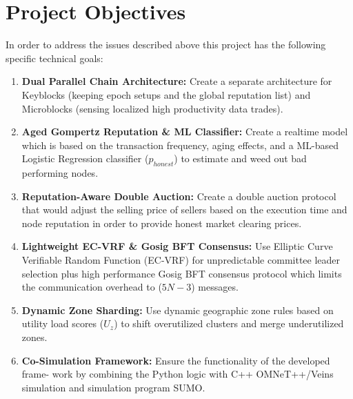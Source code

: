 \section{Project Objectives}\label{sec:intro_objectives}
\noindent In order to address the issues described above this project has the following specific technical goals:
\begin{enumerate}
    \item \textbf{Dual Parallel Chain Architecture:} Create a separate architecture for Keyblocks (keeping epoch setups and the global reputation list) and Microblocks (sensing localized high productivity data trades).
    \item \textbf{Aged Gompertz Reputation \& ML Classifier:} Create a realtime model which is based on the transaction frequency, aging effects, and a ML-based Logistic Regression classifier ($p_{honest}$) to estimate and weed out bad performing nodes.
    \item \textbf{Reputation-Aware Double Auction:} Create a double auction protocol that would adjust the selling price of sellers based on the execution time and node reputation in order to provide honest market clearing prices.
    \item \textbf{Lightweight EC-VRF \& Gosig BFT Consensus:} Use Elliptic Curve Verifiable Random Function (EC-VRF) for unpredictable committee leader selection plus high performance Gosig BFT consensus protocol which limits the communication overhead to ($5N-3$) messages.
    \item \textbf{Dynamic Zone Sharding:} Use dynamic geographic zone rules based on utility load scores ($U_z$) to shift overutilized clusters and merge underutilized zones.
    \item \textbf{Co-Simulation Framework:} Ensure the functionality of the developed frame-
    work by combining the Python logic with C++ OMNeT++/Veins simulation and simulation program SUMO.
\end{enumerate}

